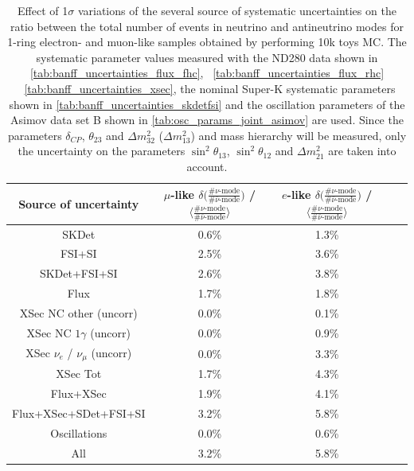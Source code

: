 \begin{table}
\center
\begin{tabular}{| c || c | c || c | c |}
\hline
Source of uncertainty 
&$\mu$-like ${\delta} \Big( \frac{\# {\nu} \text{-mode}}{\# {\bar{\nu}} \text{-mode} } \Big) $ / $\Big \langle \frac{\# {\nu} \text{-mode}}{\# {\bar{\nu}} \text{-mode} } \Big \rangle$ 
&$e$-like ${\delta} \Big( \frac{\# {\nu} \text{-mode}}{\# {\bar{\nu}} \text{-mode} } \Big) $ / $\Big \langle \frac{\# {\nu} \text{-mode}}{\# {\bar{\nu}} \text{-mode} } \Big \rangle$ \\

\hline
SKDet & 0.6\%  & 1.3\% \\ \hline
FSI+SI & 2.5\% & 3.6\% \\ \hline
SKDet+FSI+SI & 2.6\% & 3.8\% \\ \hline
\hline
Flux & 1.7\% & 1.8\% \\ \hline
XSec NC other (uncorr) & 0.0\% & 0.1\% \\ \hline
XSec NC $1\gamma$ (uncorr) & 0.0\% & 0.9\% \\ \hline
XSec $\nu_e$ / $\nu_{\mu}$ (uncorr) & 0.0\% & 3.3\% \\ \hline
XSec Tot & 1.7\% & 4.3\% \\ \hline
 \hline
Flux+XSec & 1.9\% & 4.1\% \\ \hline
 \hline
Flux+XSec+SDet+FSI+SI & 3.2\% & 5.8\% \\ \hline
 \hline
Oscillations & 0.0\% & 0.6\% \\ \hline
 \hline
All & 3.2\% & 5.8\% \\ \hline


\hline

\end{tabular}
\caption{
 Effect of 1$\sigma$ variations of the several source of systematic uncertainties 
 on the ratio between the
 total number of events in neutrino and antineutrino modes
 for 1-ring electron- and muon-like samples
 obtained by performing 10k toys MC.
 The systematic parameter values measured with the ND280 data 
shown in 
\cref{tab:banff_uncertainties_flux_fhc},
~\ref{tab:banff_uncertainties_flux_rhc}
~\ref{tab:banff_uncertainties_xsec},
the nominal Super-K systematic parameters shown in \cref{tab:banff_uncertainties_skdetfsi}
and the oscillation parameters of the Asimov data set B shown in \cref{tab:osc_params_joint_asimov}
are used.
Since the parameters $\delta_{CP}$, $\theta_{23}$ and $\Delta m^2_{32}$ ($\Delta m^2_{13}$) and mass hierarchy
will be measured,
only the uncertainty on the parameters 
$\sin^2 \theta_{13}$,
$\sin^2 \theta_{12}$
and 
$\Delta m^2_{21}$ 
are taken into account.
}             
\label{tab:ratio_systematic_table_summary_asimov_B_Run17b}                                                                                                                                                                             
\end{table}
